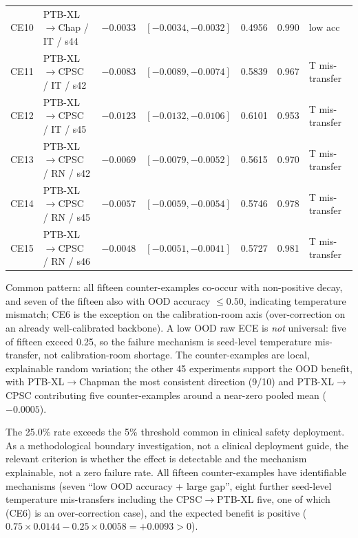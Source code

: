 \documentclass[final,5p,times,nonatbib]{elsarticle}
\begin{document}
\begin{table}[tb]
{\begin{tabular}{llrrrrl}
CE10 & PTB-XL$\to$Chap / IT / s44 & $-0.0033$ & $[-0.0034,-0.0032]$ & 0.4956 & 0.990 & low acc \\
CE11 & PTB-XL$\to$CPSC / IT / s42 & $-0.0083$ & $[-0.0089,-0.0074]$ & 0.5839 & 0.967 & T mis-transfer \\
CE12 & PTB-XL$\to$CPSC / IT / s45 & $-0.0123$ & $[-0.0132,-0.0106]$ & 0.6101 & 0.953 & T mis-transfer \\
CE13 & PTB-XL$\to$CPSC / RN / s42 & $-0.0069$ & $[-0.0079,-0.0052]$ & 0.5615 & 0.970 & T mis-transfer \\
CE14 & PTB-XL$\to$CPSC / RN / s45 & $-0.0057$ & $[-0.0059,-0.0054]$ & 0.5746 & 0.978 & T mis-transfer \\
CE15 & PTB-XL$\to$CPSC / RN / s46 & $-0.0048$ & $[-0.0051,-0.0041]$ & 0.5727 & 0.981 & T mis-transfer \\
\bottomrule
\end{tabular}}
\end{table}

Common pattern: all fifteen counter-examples co-occur with non-positive
decay, and seven of the fifteen also with OOD accuracy $\leq 0.50$,
indicating temperature mismatch; CE6 is the exception on the
calibration-room axis (over-correction on an already well-calibrated
backbone). A low OOD raw ECE is \emph{not} universal: five of fifteen exceed
0.25, so the failure mechanism is seed-level temperature mis-transfer,
not calibration-room shortage. The counter-examples are local,
explainable random variation; the other 45 experiments support the OOD
benefit, with PTB-XL$\rightarrow$Chapman the most consistent direction
(9/10) and PTB-XL$\rightarrow$CPSC contributing five counter-examples
around a near-zero pooled mean ($-0.0005$).

The 25.0\% rate exceeds the 5\% threshold common in clinical safety
deployment. As a methodological boundary investigation, not a clinical
deployment guide, the relevant criterion is whether the effect is
detectable and the mechanism explainable, not a zero failure rate. All
fifteen counter-examples have identifiable mechanisms (seven ``low OOD
accuracy + large gap'', eight further seed-level temperature
mis-transfers including the CPSC$\rightarrow$PTB-XL five, one of which
(CE6) is an over-correction case), and the
expected benefit is positive
($0.75 \times 0.0144 - 0.25 \times 0.0058 = +0.0093 > 0$).

\end{document}
